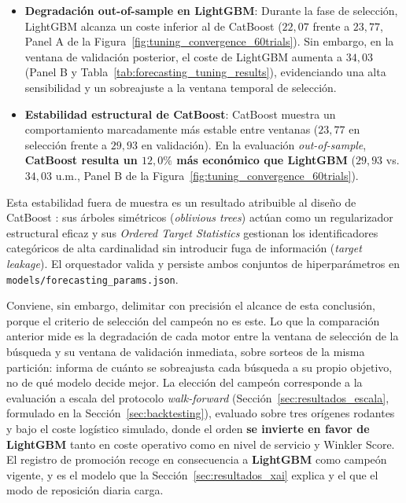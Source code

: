 \begin{itemize}
    \item \textbf{Degradación out-of-sample en LightGBM}: Durante la fase de selección, LightGBM alcanza un coste inferior al de CatBoost ($22{,}07$ frente a $23{,}77$, Panel A de la Figura~\ref{fig:tuning_convergence_60trials}). Sin embargo, en la ventana de validación posterior, el coste de LightGBM aumenta a $34{,}03$ (Panel B y Tabla~\ref{tab:forecasting_tuning_results}), evidenciando una alta sensibilidad y un sobreajuste a la ventana temporal de selección.
    \item \textbf{Estabilidad estructural de CatBoost}: CatBoost muestra un comportamiento marcadamente más estable entre ventanas ($23{,}77$ en selección frente a $29{,}93$ en validación). En la evaluación \textit{out-of-sample}, \textbf{CatBoost resulta un $12{,}0\%$ más económico que LightGBM} ($29{,}93$ vs. $34{,}03$ u.m., Panel B de la Figura~\ref{fig:tuning_convergence_60trials}).
\end{itemize}

Esta estabilidad fuera de muestra es un resultado atribuible al diseño de CatBoost \cite{prokhorenkova2018catboost}: sus árboles simétricos (\textit{oblivious trees}) actúan como un regularizador estructural eficaz y sus \textit{Ordered Target Statistics} gestionan los identificadores categóricos de alta cardinalidad sin introducir fuga de información (\textit{target leakage}). El orquestador valida y persiste ambos conjuntos de hiperparámetros en \texttt{models/forecasting\_params.json}.

Conviene, sin embargo, delimitar con precisión el alcance de esta conclusión, porque el criterio de selección del campeón no es este. Lo que la comparación anterior mide es la degradación de cada motor entre la ventana de selección de la búsqueda y su ventana de validación inmediata, sobre sorteos de la misma partición: informa de cuánto se sobreajusta cada búsqueda a su propio objetivo, no de qué modelo decide mejor. La elección del campeón corresponde a la evaluación a escala del protocolo \textit{walk-forward} (Sección~\ref{sec:resultados_escala}, formulado en la Sección~\ref{sec:backtesting}), evaluado sobre tres orígenes rodantes y bajo el coste logístico simulado, donde el orden \textbf{se invierte en favor de LightGBM} tanto en coste operativo como en nivel de servicio y Winkler Score. El registro de promoción recoge en consecuencia a \textbf{LightGBM} como campeón vigente, y es el modelo que la Sección~\ref{sec:resultados_xai} explica y el que el modo de reposición diaria carga.

